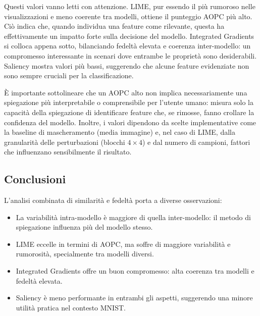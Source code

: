 \documentclass{article}
\begin{document}
\noindent
Questi valori vanno letti con attenzione. LIME, pur essendo il più rumoroso nelle visualizzazioni e meno coerente tra modelli, ottiene il punteggio AOPC più alto.
Ciò indica che, quando individua una feature come rilevante, questa ha effettivamente un impatto forte sulla decisione del modello.
Integrated Gradients si colloca appena sotto, bilanciando fedeltà elevata e coerenza inter-modello: un compromesso interessante in scenari dove entrambe le proprietà sono desiderabili.
Saliency mostra valori più bassi, suggerendo che alcune feature evidenziate non sono sempre cruciali per la classificazione.

È importante sottolineare che un AOPC alto non implica necessariamente una spiegazione più interpretabile o comprensibile per l’utente umano: misura solo la capacità della spiegazione di identificare feature che, se rimosse, fanno crollare la confidenza del modello.
Inoltre, i valori dipendono da scelte implementative come la baseline di mascheramento (media immagine) e, nel caso di LIME, dalla granularità delle perturbazioni (blocchi $4\times4$) e dal numero di campioni, fattori che influenzano sensibilmente il risultato.

\subsection{Conclusioni}
L’analisi combinata di similarità e fedeltà porta a diverse osservazioni:
\begin{itemize}
      \item La variabilità intra-modello è maggiore di quella inter-modello: il metodo di
            spiegazione influenza più del modello stesso.
      \item LIME eccelle in termini di AOPC, ma soffre di maggiore variabilità e
            rumorosità, specialmente tra modelli diversi.
      \item Integrated Gradients offre un buon compromesso: alta coerenza tra modelli e
            fedeltà elevata.
      \item Saliency è meno performante in entrambi gli aspetti, suggerendo una minore
            utilità pratica nel contesto MNIST.
\end{itemize}
\end{document}
